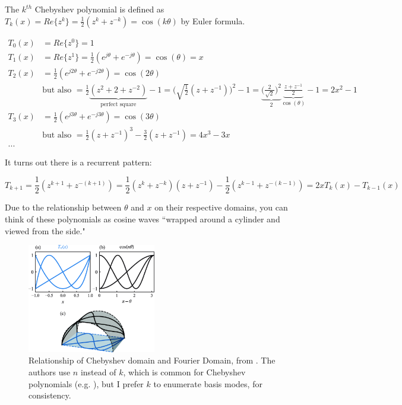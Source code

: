 \documentclass[10pt]{article}
\begin{document}
The $k^{th}$ Chebyshev polynomial is defined as $T_k(x) = Re\{z^k\} = \frac{1}{2}(z^k + z^{-k}) = \cos(k\theta)$ by Euler formula.

\begin{align*}
T_0(x) &= Re\{z^0\} = 1\\
T_1(x) &= Re\{z^1\} = \frac{1}{2}(e^{j\theta} + e^{-j\theta}) = \cos(\theta) = x\\
T_2(x) &= \frac{1}{2}(e^{j2\theta} + e^{-j2\theta}) = \cos(2\theta)\\
& \text{but also } = \frac{1}{2}\underbrace{(z^2 + 2 + z^{-2})}_{\text{perfect square}} - 1 = \Big( \sqrt{\frac{1}{2}} (z + z^{-1}) \Big)^2 - 1 = \underbrace{\Big( \frac{2}{\sqrt{2}} \Big)^2}_{2} \underbrace{\frac{z + z^{-1}}{2}}_{\cos(\theta)} - 1 = 2x^2 - 1\\
T_3(x) &= \frac{1}{2}(e^{j3\theta} + e^{-j3\theta}) = \cos(3\theta)\\
& \text{but also } = \frac{1}{2}(z + z^{-1})^3 - \frac{3}{2}(z + z^{-1}) = 4x^3 - 3x\\
...
\end{align*}

It turns out there is a recurrent pattern:

$$ T_{k+1} = \frac{1}{2}(z^{k+1} + z^{-(k+1)}) = \frac{1}{2}(z^k + z^{-k})(z + z^{-1}) - \frac{1}{2}(z^{k-1} + z^{-(k-1)}) = 2xT_k(x) - T_{k-1}(x) $$

Due to the relationship between $\theta$ and $x$ on their respective domains, you can think of these polynomials as cosine waves ``wrapped around a cylinder and viewed from the side."\cite{trefethen}

\begin{figure}[h]
	\centering
	\includegraphics[width=0.5\textwidth]{cylinder.png}
	\captionsetup{width=0.65\textwidth}
	\caption*{Relationship of Chebyshev domain and Fourier Domain, from \cite{cylinder}. The authors use $n$ instead of $k$, which is common for Chebyshev polynomials (e.g. \cite{trefethen}), but I prefer $k$ to enumerate basis modes, for consistency.}
\end{figure}
\end{document}
